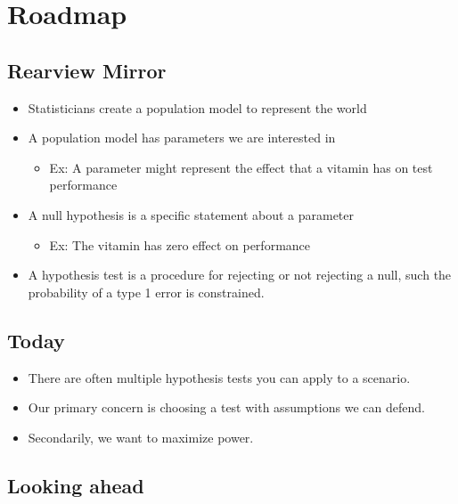 \documentclass[
]{book}
\providecommand{\tightlist}{%
  \setlength{\itemsep}{0pt}\setlength{\parskip}{0pt}}
\theoremstyle{definition}
\theoremstyle{definition}
\theoremstyle{definition}
\theoremstyle{definition}
\theoremstyle{remark}
\begin{document}
\hypertarget{roadmap-4}{%
\section{Roadmap}\label{roadmap-4}}

\hypertarget{rearview-mirror-1}{%
\subsection{Rearview Mirror}\label{rearview-mirror-1}}

\begin{itemize}
\tightlist
\item
  Statisticians create a population model to represent the world
\item
  A population model has parameters we are interested in

  \begin{itemize}
  \tightlist
  \item
    Ex: A parameter might represent the effect that a vitamin has on test performance
  \end{itemize}
\item
  A null hypothesis is a specific statement about a parameter

  \begin{itemize}
  \tightlist
  \item
    Ex: The vitamin has zero effect on performance
  \end{itemize}
\item
  A hypothesis test is a procedure for rejecting or not rejecting a null, such the probability of a type 1 error is constrained.
\end{itemize}

\hypertarget{today}{%
\subsection{Today}\label{today}}

\begin{itemize}
\tightlist
\item
  There are often multiple hypothesis tests you can apply to a scenario.
\item
  Our primary concern is choosing a test with assumptions we can defend.
\item
  Secondarily, we want to maximize power.
\end{itemize}

\hypertarget{looking-ahead}{%
\subsection{Looking ahead}\label{looking-ahead}}
\end{document}
